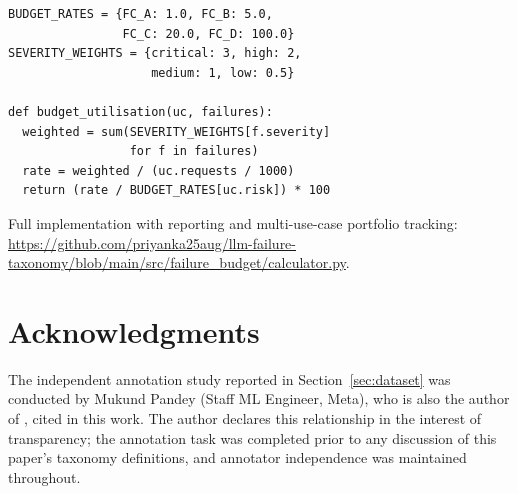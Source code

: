 \documentclass{article}
\begin{document}
\begin{minipage}{\columnwidth}
\begin{Verbatim}[fontsize=\small]
BUDGET_RATES = {FC_A: 1.0, FC_B: 5.0,
                FC_C: 20.0, FC_D: 100.0}
SEVERITY_WEIGHTS = {critical: 3, high: 2,
                    medium: 1, low: 0.5}

def budget_utilisation(uc, failures):
  weighted = sum(SEVERITY_WEIGHTS[f.severity]
                 for f in failures)
  rate = weighted / (uc.requests / 1000)
  return (rate / BUDGET_RATES[uc.risk]) * 100
\end{Verbatim}
\end{minipage}

\vspace{0.5em}
Full implementation with reporting and multi-use-case portfolio tracking:
{\small\url{https://github.com/priyanka25aug/llm-failure-taxonomy/blob/main/src/failure_budget/calculator.py}}.

\section*{Acknowledgments}

The independent annotation study reported in Section~\ref{sec:dataset} was
conducted by Mukund Pandey (Staff ML Engineer, Meta), who is also the author
of \citet{pandey2026evaluating}, cited in this work.  The author declares this
relationship in the interest of transparency; the annotation task was completed
prior to any discussion of this paper's taxonomy definitions, and annotator
independence was maintained throughout.
\end{document}
